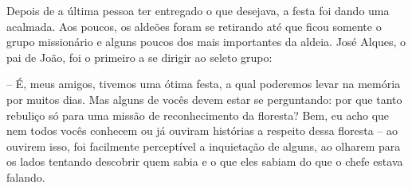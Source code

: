 Depois de a última pessoa ter entregado o que desejava, a festa foi dando uma acalmada. Aos poucos, os aldeões foram se retirando até que ficou somente o grupo missionário e alguns poucos dos mais importantes da aldeia. José Alques, o pai de João, foi o primeiro a se dirigir ao seleto grupo:

-- É, meus amigos, tivemos uma ótima festa, a qual poderemos levar na memória por muitos dias. Mas alguns de vocês devem estar se perguntando: por que tanto rebuliço só para uma missão de reconhecimento da floresta? Bem, eu acho que nem todos vocês conhecem ou já ouviram histórias a respeito dessa floresta -- ao ouvirem isso, foi facilmente perceptível a inquietação de alguns, ao olharem para os lados tentando descobrir quem sabia e o que eles sabiam do que o chefe estava falando.
